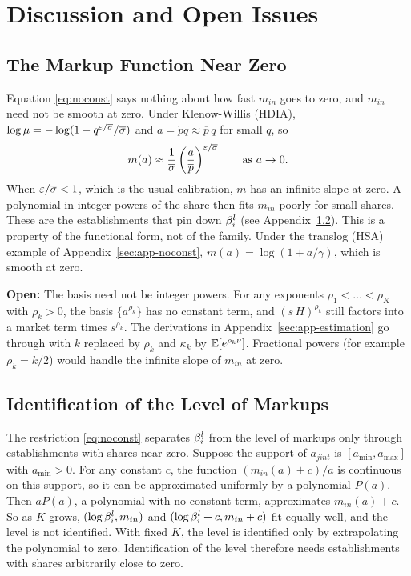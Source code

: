 
\section{Discussion and Open Issues}\label{sec:app-discussion}

\subsection{The Markup Function Near Zero}\label{sec:app-shape}

Equation \eqref{eq:noconst} says nothing about how fast $m_{in}$ goes to zero, and $m_{in}$ need not be smooth at zero.
Under Klenow-Willis (HDIA), $\log \mu = -\log(1 - q^{\varepsilon/\overline{\sigma}}/\overline{\sigma})$ and $a = \check{p} q \approx \overline{p}\, q$ for small $q$, so
\begin{equation*}
	m(a) \approx \frac{1}{\overline{\sigma}} \left(\frac{a}{\overline{p}}\right)^{\varepsilon/\overline{\sigma}} \qquad \text{as } a \to 0.
\end{equation*}
When $\varepsilon/\overline{\sigma} < 1$, which is the usual calibration, $m$ has an infinite slope at zero.
A polynomial in integer powers of the share then fits $m_{in}$ poorly for small shares.
These are the establishments that pin down $\beta^l_i$ (see Appendix~\ref{sec:app-level}).
This is a property of the functional form, not of the family.
Under the translog (HSA) example of Appendix~\ref{sec:app-noconst}, $m(a) = \log(1 + a/\gamma)$, which is smooth at zero.

\textbf{Open:} The basis need not be integer powers.
For any exponents $\rho_1 < \dots < \rho_K$ with $\rho_k > 0$, the basis $\{a^{\rho_k}\}$ has no constant term, and $(s \, H)^{\rho_k}$ still factors into a market term times $s^{\rho_k}$.
The derivations in Appendix~\ref{sec:app-estimation} go through with $k$ replaced by $\rho_k$ and $\kappa_k$ by $\mathbb{E}[e^{\rho_k \nu}]$.
Fractional powers (for example $\rho_k = k/2$) would handle the infinite slope of $m_{in}$ at zero.

\subsection{Identification of the Level of Markups}\label{sec:app-level}

The restriction \eqref{eq:noconst} separates $\beta^l_i$ from the level of markups only through establishments with shares near zero.
Suppose the support of $a_{jint}$ is $[a_{\min}, a_{\max}]$ with $a_{\min} > 0$.
For any constant $c$, the function $(m_{in}(a) + c)/a$ is continuous on this support, so it can be approximated uniformly by a polynomial $P(a)$.
Then $a P(a)$, a polynomial with no constant term, approximates $m_{in}(a) + c$.
So as $K$ grows, $(\log\beta^l_i, m_{in})$ and $(\log\beta^l_i + c, m_{in} + c)$ fit equally well, and the level is not identified.
With fixed $K$, the level is identified only by extrapolating the polynomial to zero.
Identification of the level therefore needs establishments with shares arbitrarily close to zero.

